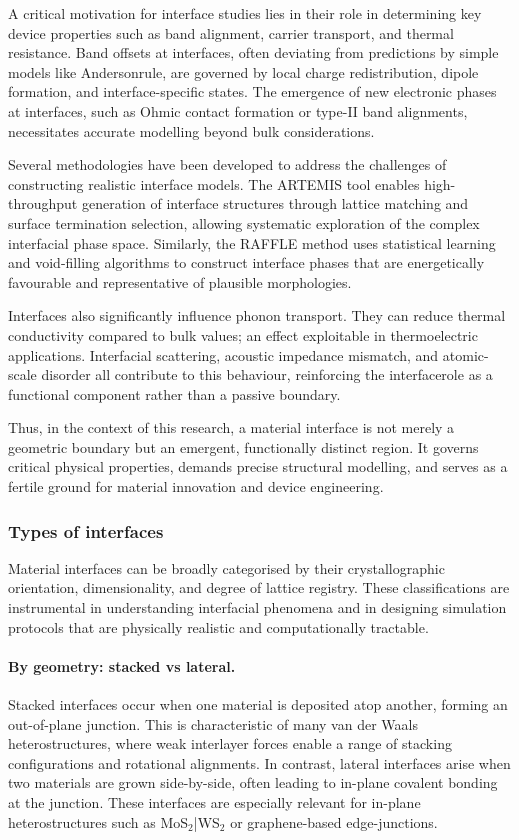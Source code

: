 A critical motivation for interface studies lies in their role in determining key device properties such as band alignment, carrier transport, and thermal resistance. Band offsets at interfaces, often deviating from predictions by simple models like Anderson\rqs rule, are governed by local charge redistribution, dipole formation, and interface-specific states. The emergence of new electronic phases at interfaces, such as Ohmic contact formation or type-II band alignments, necessitates accurate modelling beyond bulk considerations. 
 
Several methodologies have been developed to address the challenges of constructing realistic interface models. The ARTEMIS tool enables high-throughput generation of interface structures through lattice matching and surface termination selection, allowing systematic exploration of the complex interfacial phase space. Similarly, the RAFFLE method uses statistical learning and void-filling algorithms to construct interface phases that are energetically favourable and representative of plausible morphologies. 
 
Interfaces also significantly influence phonon transport. They can reduce thermal conductivity compared to bulk values; an effect exploitable in thermoelectric applications. Interfacial scattering, acoustic impedance mismatch, and atomic-scale disorder all contribute to this behaviour, reinforcing the interface\rqs role as a functional component rather than a passive boundary. 
 
Thus, in the context of this research, a material interface is not merely a geometric boundary but an emergent, functionally distinct region. It governs critical physical properties, demands precise structural modelling, and serves as a fertile ground for material innovation and device engineering. 
 
\subsubsection{Types of interfaces} 
 
Material interfaces can be broadly categorised by their crystallographic orientation, dimensionality, and degree of lattice registry. These classifications are instrumental in understanding interfacial phenomena and in designing simulation protocols that are physically realistic and computationally tractable. 
 
\paragraph{By geometry: stacked vs lateral.} Stacked interfaces occur when one material is deposited atop another, forming an out-of-plane junction. This is characteristic of many van der Waals heterostructures, where weak interlayer forces enable a range of stacking configurations and rotational alignments. In contrast, lateral interfaces arise when two materials are grown side-by-side, often leading to in-plane covalent bonding at the junction. These interfaces are especially relevant for in-plane heterostructures such as MoS$_2$|WS$_2$ or graphene-based edge-junctions. 
 
